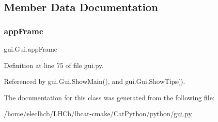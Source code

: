 \subsection{Member Data Documentation}
\mbox{\label{classgui_1_1Gui_a8dd3e3c3487fdde75eaa7d9b6b68cfa4}} 
\subsubsection{\texorpdfstring{app\+Frame}{appFrame}}
{\footnotesize\ttfamily gui.\+Gui.\+app\+Frame}



Definition at line 75 of file gui.\+py.



Referenced by gui.\+Gui.\+Show\+Main(), and gui.\+Gui.\+Show\+Tips().



The documentation for this class was generated from the following file\+:\begin{DoxyCompactItemize}
\item 
/home/eleclhcb/\+L\+H\+Cb/lbcat-\/cmake/\+Cat\+Python/python/\hyperlink{gui_8py}{gui.\+py}\end{DoxyCompactItemize}
